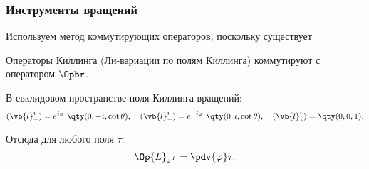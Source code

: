 \documentclass[compress]{beamer}
\begin{document}

    \begin{frame}\frametitle{Инструменты вращений}

        Используем метод коммутирующих операторов, поскольку существует
        \begin{theorem}
            Операторы Киллинга (Ли-вариации по полям Киллинга) коммутируют с оператором $\Opbr$.
        \end{theorem}
        В евклидовом пространстве поля Киллинга вращений:
        \begin{equation*}
            (\vb{l}_{+}^i) = e^{i\varphi}\ \qty(0,-i,\cot\theta), \quad
            (\vb{l}_{-}^i) = e^{-i\varphi}\ \qty(0,i,\cot\theta), \quad
            (\vb{l}_z^i)   = \qty(0,0,1).
        \end{equation*}

        Отсюда для любого поля $\tau$:
        \begin{equation*}
            \Op{L}_z \tau = \pdv{\varphi} \tau.
        \end{equation*}

    \end{frame}

\end{document}
